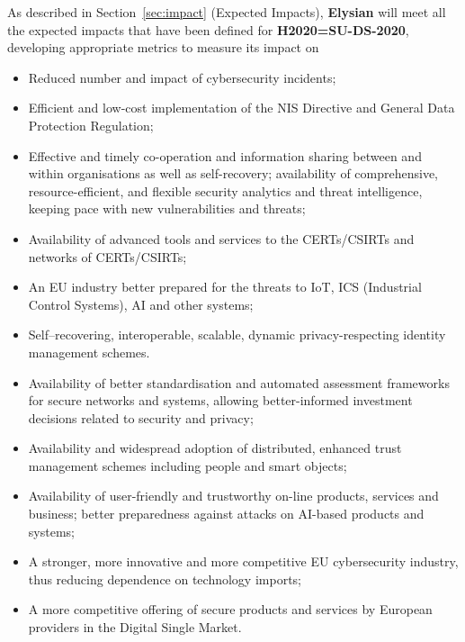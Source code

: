 \documentclass[a4paper,11pt]{article}
\newcommand{\project}[1]{\textbf{#1}\xspace}
\newcommand{\SECURITY}{\project{Elysian}}
\newcommand{\TheProject}{\SECURITY}
\begin{document}
As described in Section~\ref{sec:impact} (Expected Impacts), \TheProject{} will meet all the expected impacts that have been defined for \textbf{H2020=SU-DS-2020}, developing appropriate metrics to measure its impact on
\begin{itemize}
\item Reduced number and impact of cybersecurity incidents;
\item Efficient and low-cost implementation of the NIS Directive and General Data Protection Regulation;
\item Effective and timely co-operation and information sharing between and within organisations as well as self-recovery;
availability of comprehensive, resource-efficient, and flexible security analytics and threat intelligence, keeping pace with new vulnerabilities and threats;
\item Availability of advanced tools and services to the CERTs/CSIRTs and networks of CERTs/CSIRTs;
\item An EU industry better prepared for the threats to IoT, ICS (Industrial Control Systems), AI and other systems;
\item Self–recovering, interoperable, scalable, dynamic privacy-respecting identity management schemes.
\item Availability of better standardisation and automated assessment frameworks for secure networks and systems, allowing better-informed investment decisions related to security and privacy;
\item Availability and widespread adoption of distributed, enhanced trust management schemes including people and smart objects;
\item Availability of user-friendly and trustworthy on-line products, services and business;
better preparedness against attacks on AI-based products and systems;
\item A stronger, more innovative and more competitive EU cybersecurity industry, thus reducing dependence on technology imports;
\item A more competitive offering of secure products and services by European providers in the Digital Single Market.
\end{itemize}
\end{document}
